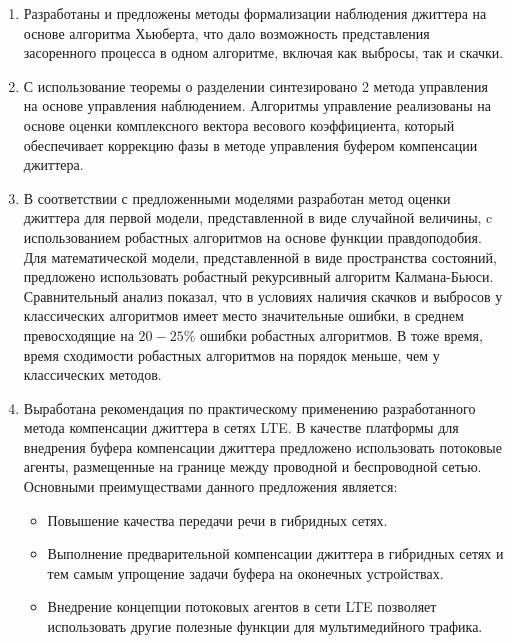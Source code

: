 \begin{enumerate}
 \item Разработаны и предложены методы формализации наблюдения джиттера
 на основе алгоритма Хьюберта, что дало возможность представления засоренного процесса в одном алгоритме, включая как выбросы, так и скачки.
 
 \item С использование теоремы о разделении синтезировано 2 метода управления на основе управления наблюдением.
 Алгоритмы управление реализованы на основе оценки комплексного вектора весового коэффициента, который обеспечивает коррекцию фазы в методе управления буфером компенсации джиттера.
 

 
 \item В соответствии с предложенными моделями разработан метод оценки джиттера для первой модели, представленной в виде случайной величины, 
 c использованием робастных алгоритмов на основе функции правдоподобия.
 Для математической модели, представленной в виде пространства состояний, предложено использовать робастный рекурсивный алгоритм Калмана-Бьюси.
 Сравнительный анализ показал, что в условиях наличия скачков и выбросов у классических алгоритмов имеет место значительные ошибки, в среднем превосходящие на $20-25\%$ ошибки робастных алгоритмов.
 В тоже время, время сходимости робастных алгоритмов на порядок меньше, чем у классических методов.
 
 \item Выработана рекомендация по практическому применению разработанного метода компенсации джиттера в сетях LTE.
 В качестве платформы для внедрения буфера компенсации джиттера предложено использовать потоковые агенты, размещенные на границе между проводной и беспроводной сетью.
 Основными преимуществами данного предложения является:
 \begin{itemize}
  \item Повышение качества передачи речи в гибридных сетях.
  \item Выполнение предварительной компенсации джиттера в гибридных сетях и тем самым упрощение задачи буфера на оконечных устройствах.
  \item Внедрение концепции потоковых агентов в сети LTE позволяет использовать другие полезные функции для мультимедийного трафика.
 \end{itemize}
 
\end{enumerate}

